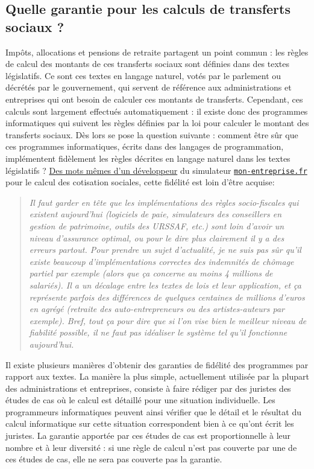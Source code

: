 
\subsection{Quelle garantie pour les calculs de transferts sociaux ?}

Impôts, allocations et pensions de retraite partagent un point commun : les règles de calcul des montants de ces transferts sociaux sont définies dans des textes législatifs. Ce sont ces textes en langage naturel, votés par le parlement ou décrétés par le gouvernement, qui servent de référence aux administrations et entreprises qui ont besoin de calculer ces montants de transferts. Cependant, ces calculs sont largement effectués automatiquement : il existe donc des programmes informatiques qui suivent les règles définies par la loi pour calculer le montant des transferts sociaux. Dès lors se pose la question suivante : comment être sûr que ces programmes informatiques, écrits dans des langages de programmation, implémentent fidèlement les règles décrites en langage naturel dans les textes législatifs ? \href{https://github.com/betagouv/mon-entreprise/issues/796#issuecomment-608446936}{Des mots mêmes d'un développeur} du simulateur \href{https://mon-entreprise.fr}{\texttt{mon-entreprise.fr}} pour le calcul des cotisation sociales, cette fidélité est loin d'être acquise:

\begin{quote}\itshape
  Il faut garder en tête que les implémentations des règles socio-fiscales qui existent aujourd'hui (logiciels de paie, simulateurs des conseillers en gestion de patrimoine, outils des URSSAF, etc.) sont loin d'avoir un niveau d'assurance optimal, ou pour le dire plus clairement il y a des erreurs partout. Pour prendre un sujet d'actualité, je ne suis pas sûr qu'il existe beaucoup d'implémentations correctes des indemnités de chômage partiel par exemple (alors que ça concerne au moins 4 millions de salariés). Il a un décalage entre les textes de lois et leur application, et ça représente parfois des différences de quelques centaines de millions d'euros en agrégé (retraite des auto-entrepreneurs ou des artistes-auteurs par exemple). Bref, tout ça pour dire que si l'on vise bien le meilleur niveau de fiabilité possible, il ne faut pas idéaliser le système tel qu'il fonctionne aujourd'hui.
\end{quote}

Il existe plusieurs manières d'obtenir des garanties de fidélité des programmes par rapport aux textes. La manière la plus simple, actuellement utilisée par la plupart des administrations et entreprises, consiste à faire rédiger par des juristes des études de cas où le calcul est détaillé pour une situation individuelle. Les programmeurs informatiques peuvent ainsi vérifier que le détail et le résultat du calcul informatique sur cette situation correspondent bien à ce qu'ont écrit les juristes. La garantie apportée par ces études de cas est proportionnelle à leur nombre et à leur diversité : si une règle de calcul n'est pas couverte par une de ces études de cas, elle ne sera pas couverte pas la garantie.


